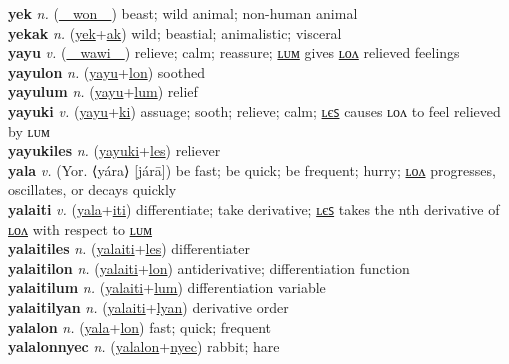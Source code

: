 \textbf{yek} \textit{n.} (\hyperref[won]{~~won~~})
beast; wild animal; non-human animal \label{yek} \\
\textbf{yekak} \textit{n.} (\hyperref[yek]{yek}+\hyperref[ak]{ak})
wild; beastial; animalistic; visceral \label{yekak} \\
\textbf{yayu} \textit{v.} (\hyperref[wawi]{~~wawi~~})
relieve; calm; reassure; \hyperref[yayulum]{ʟᴜᴍ} gives \hyperref[yayulon]{ʟᴏᴧ} relieved feelings \label{yayu} \\
\textbf{yayulon} \textit{n.} (\hyperref[yayu]{yayu}+\hyperref[lon]{lon})
soothed \label{yayulon} \\
\textbf{yayulum} \textit{n.} (\hyperref[yayu]{yayu}+\hyperref[lum]{lum})
relief \label{yayulum} \\
\textbf{yayuki} \textit{v.} (\hyperref[yayu]{yayu}+\hyperref[ki]{ki})
assuage; sooth; relieve; calm; \hyperref[yayukiles]{ʟєꜱ} causes ʟᴏᴧ to feel relieved by ʟᴜᴍ \label{yayuki} \\
\textbf{yayukiles} \textit{n.} (\hyperref[yayuki]{yayuki}+\hyperref[les]{les})
reliever \label{yayukiles} \\
\textbf{yala} \textit{v.} (Yor. ⟨yára⟩ [járā])
be fast; be quick; be frequent; hurry; \hyperref[yalalon]{ʟᴏᴧ} progresses, oscillates, or decays quickly \label{yala} \\
\textbf{yalaiti} \textit{v.} (\hyperref[yala]{yala}+\hyperref[iti]{iti})
differentiate; take derivative; \hyperref[yalaitiles]{ʟєꜱ} takes the nth derivative of \hyperref[yalaitilon]{ʟᴏᴧ} with respect to \hyperref[yalaitilum]{ʟᴜᴍ} \label{yalaiti} \\
\textbf{yalaitiles} \textit{n.} (\hyperref[yalaiti]{yalaiti}+\hyperref[les]{les})
differentiater \label{yalaitiles} \\
\textbf{yalaitilon} \textit{n.} (\hyperref[yalaiti]{yalaiti}+\hyperref[lon]{lon})
antiderivative; differentiation function \label{yalaitilon} \\
\textbf{yalaitilum} \textit{n.} (\hyperref[yalaiti]{yalaiti}+\hyperref[lum]{lum})
differentiation variable \label{yalaitilum} \\
\textbf{yalaitilyan} \textit{n.} (\hyperref[yalaiti]{yalaiti}+\hyperref[lyan]{lyan})
derivative order \label{yalaitilyan} \\
\textbf{yalalon} \textit{n.} (\hyperref[yala]{yala}+\hyperref[lon]{lon})
fast; quick; frequent \label{yalalon} \\
\textbf{yalalonnyec} \textit{n.} (\hyperref[yalalon]{yalalon}+\hyperref[nyec]{nyec})
rabbit; hare \label{yalalonnyec} \\
